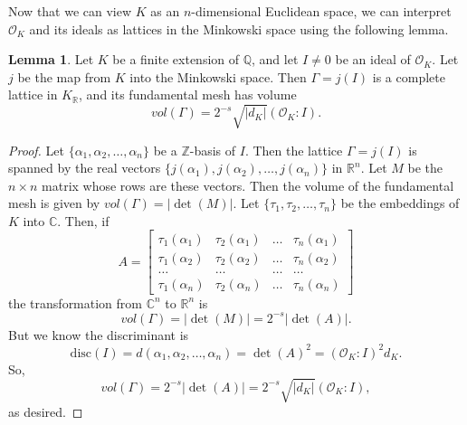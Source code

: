 \documentclass[12pt]{article}
\theoremstyle{definition}
\newtheorem{lemma}[theorem]{Lemma}
\begin{document}
Now that we can view $K$ as an $n$-dimensional Euclidean space, we can interpret $\mathcal{O}_K$ and its ideals
as lattices in the Minkowski space using the following lemma.
\begin{lemma}\label{volLemma}\cite{Eullery}
Let $K$ be a finite extension of $\mathbb{Q}$, and let $I\neq 0$ be an ideal of $\mathcal{O}_K$. Let $j$ be the map from $K$ 
into the Minkowski space. Then $\Gamma = j(I)$ is a complete lattice in $K_\mathbb{R}$, and its fundamental mesh has volume
\[vol(\Gamma)=2^{-s}\sqrt{|d_K|}(\mathcal{O}_K:I).\]
\end{lemma}
\begin{proof}
Let $\{\alpha_1, \alpha_2, \dots, \alpha_n\}$ be a $\mathbb{Z}$-basis of $I$. Then the lattice 
$\Gamma=j(I)$ is spanned by the real vectors $\{j(\alpha_1), j(\alpha_2), \dots, j(\alpha_n)\}$ in $\mathbb{R}^n$. 
Let $M$ be the $n \times n$ matrix whose rows are these vectors. Then the volume of the fundamental mesh is given by
$vol(\Gamma)=|\det(M)|.$ 
Let $\{\tau_1, \tau_2, \dots, \tau_n\}$ be the embeddings of $K$ into $\mathbb{C}$. Then, if
\[A = \begin{bmatrix}\tau_1(\alpha_1) & \tau_2(\alpha_1) & \dots & \tau_n(\alpha_1) \\ \tau_1(\alpha_2) & \tau_2(\alpha_2) & \dots & \tau_n(\alpha_2) \\ \dots & \dots & \dots & \dots \\ \tau_1(\alpha_n) & \tau_2(\alpha_n) & \dots & \tau_n(\alpha_n) \end{bmatrix}\]
the transformation from $\mathbb{C}^n$ to $\mathbb{R}^n$ is
\[vol(\Gamma) = |\det(M)| = 2^{-s}|\det(A)|.\]
But we know the discriminant is
\[\text{disc}(I) = d(\alpha_1, \alpha_2, \dots, \alpha_n) = \det(A)^2 = (\mathcal{O}_K:I)^2d_K.\]
So,
\[vol(\Gamma) = 2^{-s}|\det(A)| = 2^{-s}\sqrt{|d_K|}(\mathcal{O}_K:I),\]
as desired.
\end{proof}
\end{document}
